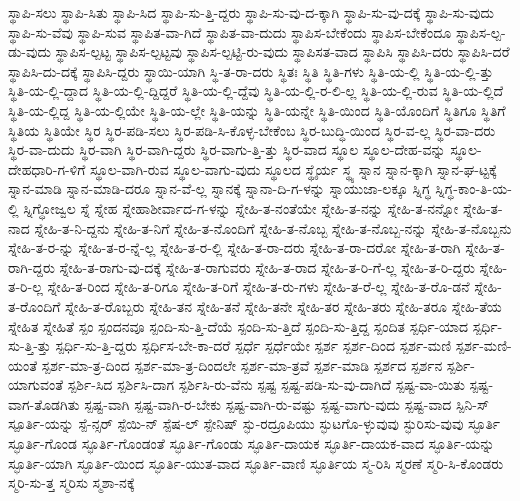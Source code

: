 {ಸ್ಥಾಪಿ-ಸಲು
ಸ್ಥಾಪಿ-ಸಿತು
ಸ್ಥಾಪಿ-ಸಿದ
ಸ್ಥಾಪಿ-ಸು-ತ್ತಿ-ದ್ದರು
ಸ್ಥಾಪಿ-ಸು-ವು-ದ-ಕ್ಕಾಗಿ
ಸ್ಥಾಪಿ-ಸು-ವು-ದಕ್ಕೆ
ಸ್ಥಾಪಿ-ಸು-ವುದು
ಸ್ಥಾಪಿ-ಸು-ವೆವು
ಸ್ಥಾಪಿ-ಸುವ
ಸ್ಥಾಪಿತ-ವಾ-ಗಿದೆ
ಸ್ಥಾಪಿತ-ವಾ-ದುದು
ಸ್ಥಾಪಿಸ-ಬೇಕೆಂದು
ಸ್ಥಾಪಿಸ-ಬೇಕೆಂದೂ
ಸ್ಥಾಪಿಸ-ಲ್ಪ-ಡು-ವುದು
ಸ್ಥಾಪಿಸ-ಲ್ಪಟ್ಟ
ಸ್ಥಾಪಿಸ-ಲ್ಪಟ್ಟವು
ಸ್ಥಾಪಿಸ-ಲ್ಪಟ್ಟಿ-ರು-ವುದು
ಸ್ಥಾಪಿಸತ-ವಾದ
ಸ್ಥಾಪಿಸಿ
ಸ್ಥಾಪಿಸಿ-ದರು
ಸ್ಥಾಪಿಸಿ-ದರೆ
ಸ್ಥಾಪಿಸಿ-ದು-ದಕ್ಕೆ
ಸ್ಥಾಪಿಸಿ-ದ್ದರು
ಸ್ಥಾಯಿ-ಯಾಗಿ
ಸ್ಥಿ-ತ-ರಾ-ದರು
ಸ್ಥಿತಃ
ಸ್ಥಿತಿ
ಸ್ಥಿತಿ-ಗಳು
ಸ್ಥಿತಿ-ಯ-ಲ್ಲಿ
ಸ್ಥಿತಿ-ಯ-ಲ್ಲಿ-ತ್ತು
ಸ್ಥಿತಿ-ಯ-ಲ್ಲಿ-ದ್ದಾದ
ಸ್ಥಿತಿ-ಯ-ಲ್ಲಿ-ದ್ದಿದ್ದರೆ
ಸ್ಥಿತಿ-ಯ-ಲ್ಲಿ-ದ್ದೆವು
ಸ್ಥಿತಿ-ಯ-ಲ್ಲಿ-ರ-ಲಿ-ಲ್ಲ
ಸ್ಥಿತಿ-ಯ-ಲ್ಲಿ-ರುವ
ಸ್ಥಿತಿ-ಯ-ಲ್ಲಿದೆ
ಸ್ಥಿತಿ-ಯ-ಲ್ಲಿದ್ದ
ಸ್ಥಿತಿ-ಯ-ಲ್ಲಿಯೇ
ಸ್ಥಿತಿ-ಯ-ಲ್ಲೇ
ಸ್ಥಿತಿ-ಯನ್ನು
ಸ್ಥಿತಿ-ಯನ್ನೇ
ಸ್ಥಿತಿ-ಯಿಂದ
ಸ್ಥಿತಿ-ಯೊಂದಿಗೆ
ಸ್ಥಿತಿಗೂ
ಸ್ಥಿತಿಗೆ
ಸ್ಥಿತಿಯ
ಸ್ಥಿತಿಯೇ
ಸ್ಥಿರ
ಸ್ಥಿರ-ಪಡಿ-ಸಲು
ಸ್ಥಿರ-ಪಡಿ-ಸಿ-ಕೊಳ್ಳ-ಬೇಕೆಂಬ
ಸ್ಥಿರ-ಬುದ್ಧಿ-ಯಿಂದ
ಸ್ಥಿರ-ವ-ಲ್ಲ
ಸ್ಥಿರ-ವಾ-ದರು
ಸ್ಥಿರ-ವಾ-ದುದು
ಸ್ಥಿರ-ವಾಗಿ
ಸ್ಥಿರ-ವಾಗಿ-ದ್ದರು
ಸ್ಥಿರ-ವಾಗು-ತ್ತಿ-ತ್ತು
ಸ್ಥಿರ-ವಾದ
ಸ್ಥೂಲ
ಸ್ಥೂಲ-ದೇಹ-ವನ್ನು
ಸ್ಥೂಲ-ದೇಹಧಾರಿ-ಗ-ಳಿಗೆ
ಸ್ಥೂಲ-ವಾಗಿ-ರುವ
ಸ್ಥೂಲ-ವಾಗು-ವುದು
ಸ್ಥೂಲದ
ಸ್ಥೈರ್ಯ
ಸ್ಥ್ಯ
ಸ್ನಾನ
ಸ್ನಾನ-ಕ್ಕಾಗಿ
ಸ್ನಾನ-ಘ-ಟ್ಟಕ್ಕೆ
ಸ್ನಾನ-ಮಾಡಿ
ಸ್ನಾನ-ಮಾಡಿ-ದರೂ
ಸ್ನಾನ-ವೆ-ಲ್ಲ
ಸ್ನಾನಕ್ಕೆ
ಸ್ನಾನಾ-ದಿ-ಗ-ಳನ್ನು
ಸ್ನಾಯುಜಾ-ಲಕ್ಕೂ
ಸ್ನಿಗ್ಧ
ಸ್ನಿಗ್ಧ-ಕಾಂ-ತಿ-ಯ-ಲ್ಲಿ
ಸ್ನಿಗ್ಧೋಜ್ವಲ
ಸ್ನೆ
ಸ್ನೇಹ
ಸ್ನೇಹಾಶೀರ್ವಾದ-ಗ-ಳನ್ನು
ಸ್ನೇಹಿ-ತ-ನಂತೆಯೇ
ಸ್ನೇಹಿ-ತ-ನನ್ನು
ಸ್ನೇಹಿ-ತ-ನನ್ನೋ
ಸ್ನೇಹಿ-ತ-ನಾದ
ಸ್ನೇಹಿ-ತ-ನಿ-ದ್ದನು
ಸ್ನೇಹಿ-ತ-ನಿಗೆ
ಸ್ನೇಹಿ-ತ-ನೊಂದಿಗೆ
ಸ್ನೇಹಿ-ತ-ನೊಬ್ಬ
ಸ್ನೇಹಿ-ತ-ನೊಬ್ಬ-ನನ್ನು
ಸ್ನೇಹಿ-ತ-ನೊಬ್ಬನು
ಸ್ನೇಹಿ-ತ-ರ-ನ್ನು
ಸ್ನೇಹಿ-ತ-ರ-ನ್ನೆ-ಲ್ಲ
ಸ್ನೇಹಿ-ತ-ರ-ಲ್ಲಿ
ಸ್ನೇಹಿ-ತ-ರಾ-ದರು
ಸ್ನೇಹಿ-ತ-ರಾ-ದರೋ
ಸ್ನೇಹಿ-ತ-ರಾಗಿ
ಸ್ನೇಹಿ-ತ-ರಾಗಿ-ದ್ದರು
ಸ್ನೇಹಿ-ತ-ರಾಗು-ವು-ದಕ್ಕೆ
ಸ್ನೇಹಿ-ತ-ರಾಗುವರು
ಸ್ನೇಹಿ-ತ-ರಾದ
ಸ್ನೇಹಿ-ತ-ರಿ-ಗೆ-ಲ್ಲ
ಸ್ನೇಹಿ-ತ-ರಿ-ದ್ದರು
ಸ್ನೇಹಿ-ತ-ರಿ-ಲ್ಲ
ಸ್ನೇಹಿ-ತ-ರಿಂದ
ಸ್ನೇಹಿ-ತ-ರಿಗೂ
ಸ್ನೇಹಿ-ತ-ರಿಗೆ
ಸ್ನೇಹಿ-ತ-ರು-ಗಳು
ಸ್ನೇಹಿ-ತ-ರೆ-ಲ್ಲ
ಸ್ನೇಹಿ-ತ-ರೊ-ಡನೆ
ಸ್ನೇಹಿ-ತ-ರೊಂದಿಗೆ
ಸ್ನೇಹಿ-ತ-ರೊಬ್ಬರು
ಸ್ನೇಹಿ-ತನ
ಸ್ನೇಹಿ-ತನೆ
ಸ್ನೇಹಿ-ತನೇ
ಸ್ನೇಹಿ-ತರ
ಸ್ನೇಹಿ-ತರು
ಸ್ನೇಹಿ-ತರೂ
ಸ್ನೇಹಿ-ತೆಯ
ಸ್ನೇಹಿತ
ಸ್ನೇಹಿತೆ
ಸ್ಪಂ
ಸ್ಪಂದನವೂ
ಸ್ಪಂದಿ-ಸು-ತ್ತಿ-ದೆಯೆ
ಸ್ಪಂದಿ-ಸು-ತ್ತಿದೆ
ಸ್ಪಂದಿ-ಸು-ತ್ತಿದ್ದ
ಸ್ಪಂದಿತ
ಸ್ಪರ್ಧಿ-ಯಾದ
ಸ್ಪರ್ಧಿ-ಸು-ತ್ತಿ-ತ್ತು
ಸ್ಪರ್ಧಿ-ಸು-ತ್ತಿ-ದ್ದರು
ಸ್ಪರ್ಧಿಸ-ಬೇ-ಕಾ-ದರೆ
ಸ್ಪರ್ಧೆ
ಸ್ಪರ್ಧೆಯೇ
ಸ್ಪರ್ಶ
ಸ್ಪರ್ಶ-ದಿಂದ
ಸ್ಪರ್ಶ-ಮಣಿ
ಸ್ಪರ್ಶ-ಮಣಿ-ಯಂತೆ
ಸ್ಪರ್ಶ-ಮಾ-ತ್ರ-ದಿಂದ
ಸ್ಪರ್ಶ-ಮಾ-ತ್ರ-ದಿಂದಲೇ
ಸ್ಪರ್ಶ-ಮಾ-ತ್ರವೆ
ಸ್ಪರ್ಶ-ಮಾಡಿ
ಸ್ಪರ್ಶದ
ಸ್ಪರ್ಶನ
ಸ್ಪರ್ಶಿ-ಯಾಗುವಂತೆ
ಸ್ಪರ್ಶಿ-ಸಿದ
ಸ್ಪರ್ಶಿಸಿ-ದಾಗ
ಸ್ಪರ್ಶಿಸಿ-ರು-ವೆನು
ಸ್ಪಷ್ಟ
ಸ್ಪಷ್ಟ-ಪಡಿ-ಸು-ವು-ದಾಗಿದೆ
ಸ್ಪಷ್ಟ-ವಾ-ಯಿತು
ಸ್ಪಷ್ಟ-ವಾಗ-ತೊಡಗಿತು
ಸ್ಪಷ್ಟ-ವಾಗಿ
ಸ್ಪಷ್ಟ-ವಾಗಿ-ರ-ಬೇಕು
ಸ್ಪಷ್ಟ-ವಾಗಿ-ರು-ವಷ್ಟು
ಸ್ಪಷ್ಟ-ವಾಗು-ವುದು
ಸ್ಪಷ್ಟ-ವಾದ
ಸ್ಪಿನಿ-ಸ್
ಸ್ಪೂರ್ತಿ-ಯನ್ನು
ಸ್ಪೆ-ನ್ಸರ್
ಸ್ಪೆಯಿ-ನ್
ಸ್ಪೆಷ-ಲ್
ಸ್ಪೇನಿಷ್
ಸ್ಫು-ರದ್ರೂಪಿಯು
ಸ್ಫುಟಗೊ-ಳ್ಳುವುವು
ಸ್ಫುರಿಸು-ವುವು
ಸ್ಫೂರ್ತಿ
ಸ್ಫೂರ್ತಿ-ಗೊಂಡ
ಸ್ಫೂರ್ತಿ-ಗೊಂಡಂತೆ
ಸ್ಫೂರ್ತಿ-ಗೊಂಡು
ಸ್ಫೂರ್ತಿ-ದಾಯಕ
ಸ್ಫೂರ್ತಿ-ದಾಯಕ-ವಾದ
ಸ್ಫೂರ್ತಿ-ಯನ್ನು
ಸ್ಫೂರ್ತಿ-ಯಾಗಿ
ಸ್ಫೂರ್ತಿ-ಯಿಂದ
ಸ್ಫೂರ್ತಿ-ಯುತ-ವಾದ
ಸ್ಫೂರ್ತಿ-ವಾಣಿ
ಸ್ಫೂರ್ತಿಯ
ಸ್ಮ-ರಿಸಿ
ಸ್ಮರಣೆ
ಸ್ಮರಿ-ಸಿ-ಕೊಂಡರು
ಸ್ಮರಿ-ಸು-ತ್ತ
ಸ್ಮರಿಸು
ಸ್ಮಶಾ-ನಕ್ಕೆ
}
